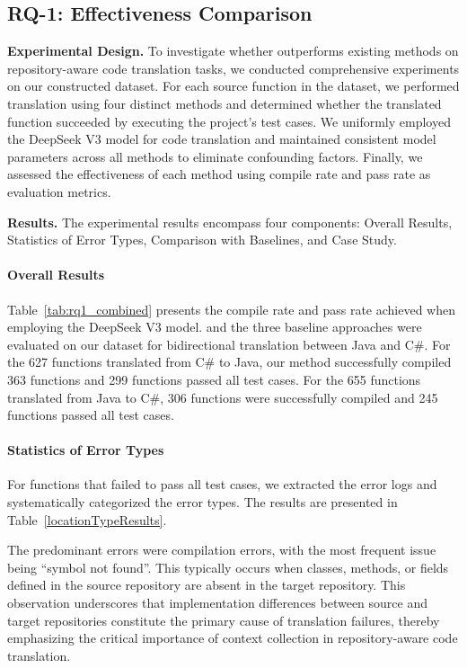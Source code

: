 

\subsection{RQ-1: Effectiveness Comparison}
\label{sec:rq1}



\noindent\textbf{Experimental Design.} To investigate whether \toolname outperforms existing methods on repository-aware code translation tasks, we conducted comprehensive experiments on our constructed dataset. For each source function in the dataset, we performed translation using four distinct methods and determined whether the translated function succeeded by executing the project's test cases. We uniformly employed the DeepSeek V3 model for code translation and maintained consistent model parameters across all methods to eliminate confounding factors. Finally, we assessed the effectiveness of each method using compile rate and pass rate as evaluation metrics.

\noindent\textbf{Results.} The experimental results encompass four components: Overall Results, Statistics of Error Types, Comparison with Baselines, and Case Study.

\paragraph{Overall Results} Table~\ref{tab:rq1_combined} presents the compile rate and pass rate achieved when employing the DeepSeek V3 model. \toolname and the three baseline approaches were evaluated on our dataset for bidirectional translation between Java and C\#. For the 627 functions translated from C\# to Java, our method successfully compiled 363 functions and 299 functions passed all test cases. For the 655 functions translated from Java to C\#, 306 functions were successfully compiled and 245 functions passed all test cases.

\paragraph{Statistics of Error Types} For functions that failed to pass all test cases, we extracted the error logs and systematically categorized the error types. The results are presented in Table~\ref{locationTypeResults}. 

The predominant errors were compilation errors, with the most frequent issue being ``symbol not found''. 
This typically occurs when classes, methods, or fields defined in the source repository are absent in the target repository. This observation underscores that implementation differences between source and target repositories constitute the primary cause of translation failures, thereby emphasizing the critical importance of context collection in repository-aware code translation.

